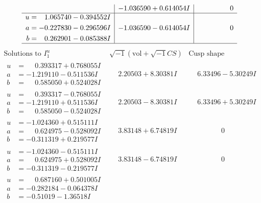 \documentclass[1p]{elsarticle_modified}
\theoremstyle{definition}
\newcommand{\I}{\sqrt{-1}}
\begin{document}
$$\begin{array}{c|c|c}
 & -1.036590 + 0.614054 I & \phantom{-0.000000 } 0 \\ \hline\begin{aligned}
u &= \phantom{-}1.065740 - 0.394552 I \\
a &= -0.227830 - 0.296596 I \\
b &= \phantom{-}0.262901 - 0.085388 I\end{aligned}
 & -1.036590 - 0.614054 I & \phantom{-0.000000 } 0\\
 \hline 
 \end{array}$$\newpage$$\begin{array}{c|c|c}  
\text{Solutions to }I^u_{1}& \I (\text{vol} + \sqrt{-1}CS) & \text{Cusp shape}\\
 \hline 
\begin{aligned}
u &= \phantom{-}0.393317 + 0.768055 I \\
a &= -1.219110 - 0.511536 I \\
b &= \phantom{-}0.585050 + 0.524028 I\end{aligned}
 & \phantom{-}2.20503 + 8.30381 I & \phantom{-}6.33496 - 5.30249 I \\ \hline\begin{aligned}
u &= \phantom{-}0.393317 - 0.768055 I \\
a &= -1.219110 + 0.511536 I \\
b &= \phantom{-}0.585050 - 0.524028 I\end{aligned}
 & \phantom{-}2.20503 - 8.30381 I & \phantom{-}6.33496 + 5.30249 I \\ \hline\begin{aligned}
u &= -1.024360 + 0.515111 I \\
a &= \phantom{-}0.624975 - 0.528092 I \\
b &= -0.311319 + 0.219577 I\end{aligned}
 & \phantom{-}3.83148 + 6.74819 I & \phantom{-0.000000 } 0 \\ \hline\begin{aligned}
u &= -1.024360 - 0.515111 I \\
a &= \phantom{-}0.624975 + 0.528092 I \\
b &= -0.311319 - 0.219577 I\end{aligned}
 & \phantom{-}3.83148 - 6.74819 I & \phantom{-0.000000 } 0 \\ \hline\begin{aligned}
u &= \phantom{-}0.687160 + 0.501005 I \\
a &= -0.282184 - 0.064378 I \\
b &= -0.51019 - 1.36518 I\end{aligned}

\end{array}$$
\end{document}
